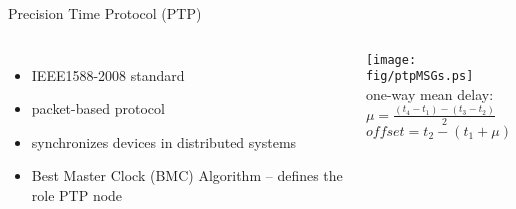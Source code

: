 \documentclass[compress,red]{beamer}
\begin{document}
\begin{frame}{Precision Time Protocol (PTP)}
\begin{columns}[c]
\column{2.8in}

  \begin{itemize}
    \item IEEE1588-2008 standard
    \item packet-based protocol 
    \item synchronizes devices in distributed systems
    \item Best Master Clock (BMC) Algorithm -- defines the role PTP node 
  \end{itemize}

\column{1.5in}
    \texttt{[image: fig/ptpMSGs.ps]} \\
    \small 
    one-way mean delay: \\
    $\mu = \frac{(t_{4}-t_{1}) - (t_{3}-t_{2})}{2}$ \\
    \small 
    $offset = t_{2} - (t_{1} + \mu)$
    
\end{columns}


\end{frame}
\end{document}
